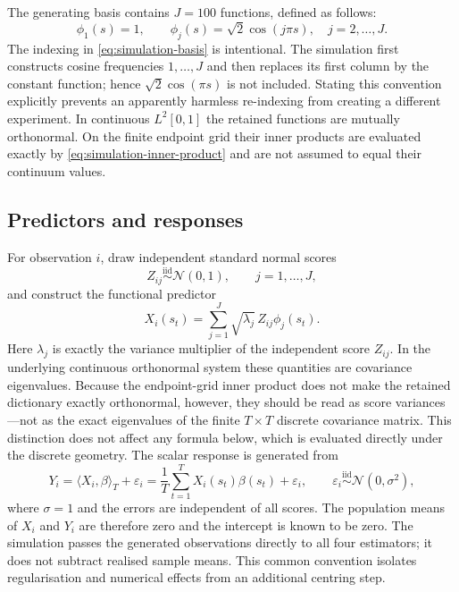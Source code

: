 The generating basis contains $J=100$ functions, defined as follows:
\begin{equation}
    \phi_1(s)=1,
    \qquad
    \phi_j(s)=\sqrt{2}\cos(j\pi s),
    \quad j=2,\ldots,J.
    \label{eq:simulation-basis}
\end{equation}
The indexing in \eqref{eq:simulation-basis} is intentional.  The simulation first
constructs cosine frequencies $1,\ldots,J$ and then replaces its first column
by the constant function; hence $\sqrt{2}\cos(\pi s)$ is not included.  Stating
this convention explicitly prevents an apparently harmless re-indexing from
creating a different experiment.  In continuous $L^2[0,1]$ the retained
functions are mutually orthonormal.  On the finite endpoint grid their
inner products are evaluated exactly by \eqref{eq:simulation-inner-product}
and are not assumed to equal their continuum values.

\subsection{Predictors and responses}

For observation $i$, draw independent standard normal scores
\begin{equation}
    Z_{ij}\stackrel{\mathrm{iid}}{\sim}\mathcal N(0,1),
    \qquad j=1,\ldots,J,
\end{equation}
and construct the functional predictor
\begin{equation}
    X_i(s_t)
    =\sum_{j=1}^{J}\sqrt{\lambda_j}\,Z_{ij}\phi_j(s_t).
    \label{eq:simulation-predictor}
\end{equation}
Here $\lambda_j$ is exactly the variance multiplier of the independent score
$Z_{ij}$.  In the underlying continuous orthonormal system these quantities
are covariance eigenvalues.  Because the endpoint-grid inner product does not
make the retained dictionary exactly orthonormal, however, they should be read
as score variances---not as the exact eigenvalues of the finite $T\times T$
discrete covariance matrix.  This distinction does not affect any formula
below, which is evaluated directly under the discrete geometry.
The scalar response is generated from
\begin{equation}
    Y_i
    =\langle X_i,\beta\rangle_T+\varepsilon_i
    =\frac1T\sum_{t=1}^{T}X_i(s_t)\beta(s_t)+\varepsilon_i,
    \qquad
    \varepsilon_i\stackrel{\mathrm{iid}}{\sim}\mathcal N(0,\sigma^2),
    \label{eq:simulation-response}
\end{equation}
where $\sigma=1$ and the errors are independent of all scores.  The population
means of $X_i$ and $Y_i$ are therefore zero and the intercept is known to be
zero.  The simulation passes the generated observations directly to all four
estimators; it does not subtract realised sample means.  This common convention
isolates regularisation and numerical effects from an additional centring
step.

